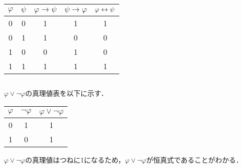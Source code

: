 \begin{table}[htbp]
	\centering
	\begin{tabular}{cc|ccc}
		\hline
		\(\varphi\) & \(\psi\) & \(\varphi \to \psi\) & \(\psi \to \varphi\) & \(\varphi \leftrightarrow \psi\) \\ \hline
		0           & 0        & 1                    & 1                    & 1                              \\
		0           & 1        & 1                    & 0                    & 0                              \\
		1           & 0        & 0                    & 1                    & 0                              \\
		1           & 1        & 1                    & 1                    & 1                              \\
		\hline
	\end{tabular}
\end{table}

\subsection*{}

\(\varphi \lor \lnot \varphi\)の真理値表を以下に示す．

\begin{table}[htbp]
	\centering
	\begin{tabular}{c|cc}
		\hline
		\(\varphi\) & \(\lnot \varphi\) & \(\varphi \lor \lnot \varphi\) \\ \hline
		0           & 1                 & 1                              \\
		1           & 0                 & 1                              \\
		\hline
	\end{tabular}
\end{table}

\(\varphi \lor \lnot \varphi\)の真理値はつねに1になるため，\(\varphi \lor \lnot \varphi\)が恒真式であることがわかる．

\subsection*{}

